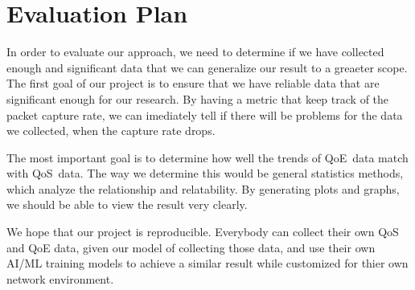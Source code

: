 \section{Evaluation Plan}\label{evaluation}
    In order to evaluate our approach, we need to determine if we have collected enough and significant data that we can generalize our result to a greaeter scope. The first goal of our project is to ensure that we have reliable data that are significant enough for our research. By having a metric that keep track of the packet capture rate, we can imediately tell if there will be problems for the data we collected, when the capture rate drops.

    The most important goal is to determine how well the trends of QoE~data match with QoS~data. The way we determine this would be general statistics methods, which analyze the relationship and relatability. By generating plots and graphs, we should be able to view the result very clearly. 

    We hope that our project is reproducible. Everybody can collect their own QoS and QoE data, given our model of collecting those data, and use their own AI/ML training models to achieve a similar result while customized for thier own network environment. 
